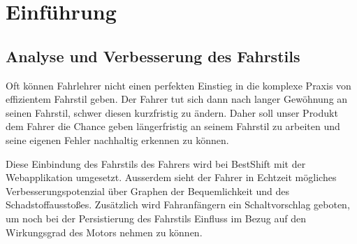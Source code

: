 \chapter{Einführung}
\section{Analyse und Verbesserung des Fahrstils}
Oft können Fahrlehrer nicht einen perfekten Einstieg in die komplexe Praxis von effizientem Fahrstil geben. Der Fahrer tut sich dann nach langer Gewöhnung an seinen Fahrstil, schwer diesen kurzfristig zu ändern. Daher soll unser Produkt dem Fahrer die Chance geben längerfristig an seinem Fahrstil zu arbeiten und seine eigenen Fehler nachhaltig erkennen zu können.

\newline
Diese Einbindung des Fahrstils des Fahrers wird bei BestShift mit der Webapplikation umgesetzt. Ausserdem sieht der Fahrer in Echtzeit mögliches Verbesserungspotenzial über Graphen der Bequemlichkeit und des Schadstoffausstoßes. Zusätzlich wird Fahranfängern ein Schaltvorschlag geboten, um noch bei der Persistierung des Fahrstils Einfluss im Bezug auf den Wirkungsgrad des Motors nehmen zu können. 